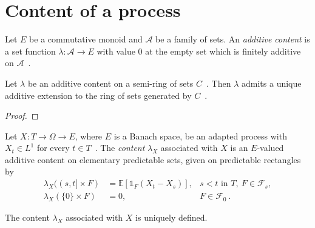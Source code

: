 \section{Content of a process}

\begin{definition}\label{def:addContent}
  \mathlibok
  Let $E$ be a commutative monoid and $\mathcal{A}$ be a family of sets.
  An \emph{additive content} is a set function $\lambda : \mathcal{A} \to E$
  with value $0$ at the empty set
  which is finitely additive on $\mathcal{A}$~.
\end{definition}

\begin{lemma}\label{lem:addContent_extension}
  \mathlibok
  Let $\lambda$ be an additive content on a semi-ring of sets $C$~.
  Then $\lambda$ admits a unique additive extension to the ring of sets generated by $C$~.
\end{lemma}

\begin{proof}\leanok
\end{proof}

\begin{definition}\label{def:contentAssociatedWithProcess}
Let $X : T \to \Omega \to E$, where $E$ is a Banach space,
 be an adapted process with $X_t \in L^1$ for every $t \in T$~.
The \emph{content} $\lambda_X$ associated with $X$
is an $E$-valued additive content on
elementary predictable sets,
given on predictable rectangles by
\begin{align*}
  \lambda_X((s, t] \times F) &= \mathbb{E}[\mathbb{1}_F (X_t - X_s)],
  & s < t \text{ in } T,\ F \in \mathcal{F}_s,
  \\
  \lambda_X(\{0\} \times F) &= 0,
  & F \in \mathcal{F}_0
  \: .
\end{align*}
\end{definition}

\begin{lemma}\label{lem:contentAssociatedWithProcess_wellDefined}
  The content $\lambda_X$ associated with $X$ is uniquely defined.
\end{lemma}

